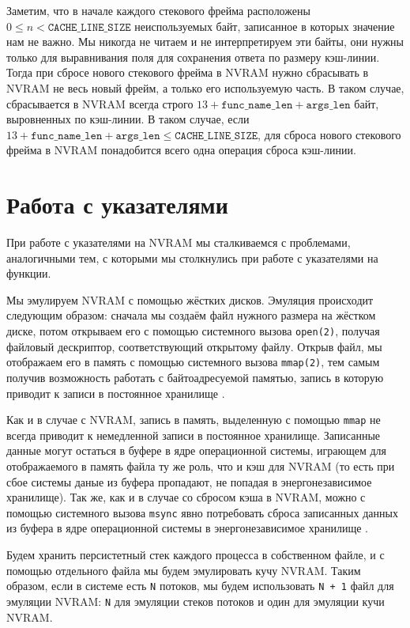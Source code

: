 \documentclass[times,specification,annotation]{itmo-student-thesis}
\begin{document}
\bigbreak

Заметим, что в начале каждого стекового фрейма расположены $0 \leq n < \texttt{CACHE\_LINE\_SIZE}$ неиспользуемых байт, записанное в которых значение нам не важно. Мы никогда не читаем и не интерпретируем эти байты, они нужны только для выравнивания поля для сохранения ответа по размеру кэш-линии. Тогда при сбросе нового стекового фрейма в NVRAM нужно сбрасывать в NVRAM не весь новый фрейм, а только  его используемую часть. В таком случае, сбрасывается в NVRAM всегда строго $13 + \texttt{func\_name\_len} + \texttt{args\_len}$ байт, выровненных по кэш-линии. В таком случае, если $13 + \texttt{func\_name\_len} + \texttt{args\_len} \leq \texttt{CACHE\_LINE\_SIZE}$, для сброса нового стекового фрейма в NVRAM понадобится всего одна операция сброса кэш-линии.

\section{Работа с указателями}

При работе с указателями на NVRAM мы сталкиваемся с проблемами, аналогичными тем, с которыми мы столкнулись при работе с указателями на функции.

Мы эмулируем NVRAM с помощью жёстких дисков. Эмуляция происходит следующим образом: сначала мы создаём файл нужного размера на жёстком диске, потом открываем его с помощью системного вызова \texttt{open(2)}, получая файловый дескриптор, соответствующий открытому файлу. Открыв файл, мы отображаем его в память с помощью системного вызова \texttt{mmap(2)}, тем самым получив возможность работать с байтоадресуемой памятью, запись в которую приводит к записи в постоянное хранилище \cite{mmap}.

Как и в случае с NVRAM, запись в память, выделенную с помощью \texttt{mmap} не всегда приводит к немедленной записи в постоянное хранилище. Записанные данные могут остаться в буфере  в ядре операционной системы, играющем для отображаемого в память файла ту же роль, что и кэш для NVRAM (то есть при сбое системы даные из буфера пропадают, не попадая в энергонезависимое хранилище). Так же, как и в случае со сбросом кэша в NVRAM, можно с помощью системного вызова \texttt{msync} явно потребовать сброса записанных данных из буфера в ядре операционной системы в энергонезависимое хранилище \cite{msync}. 

Будем хранить персистетный стек каждого процесса в собственном файле, и с помощью отдельного файла мы будем эмулировать кучу NVRAM. Таким образом, если в системе есть \texttt{N} потоков, мы будем использовать \texttt{N + 1} файл для эмуляции NVRAM: \texttt{N} для эмуляции стеков потоков и один для эмуляции кучи NVRAM.
\end{document}
